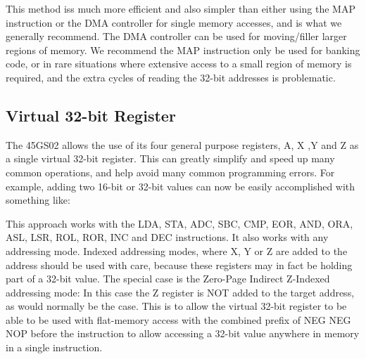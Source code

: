 This method iss much more efficient and also simpler than either using the MAP instruction or the DMA controller for single memory accesses,
and is what we generally recommend.  The DMA controller can be used for moving/filler larger regions of memory.
We recommend the MAP instruction only be used for banking code, or in rare situations where extensive access to a small region of
memory is required, and the extra cycles of reading the 32-bit addresses is problematic.

\subsection{Virtual 32-bit Register}

The 45GS02 allows the use of its four general purpose registers, A, X ,Y and Z as a single virtual 32-bit register. This can greatly
simplify and speed up many common operations, and help avoid many common programming errors.
For example, adding two 16-bit or 32-bit values can now be easily accomplished with something like:


This approach works with the LDA, STA, ADC, SBC, CMP, EOR, AND, ORA, ASL, LSR, ROL, ROR, INC and DEC instructions.
It also works with any addressing mode.  Indexed addressing modes, where X, Y or Z are added to the address should
be used with care, because these registers may in fact be holding part of a 32-bit value.  The special case is the Zero-Page
Indirect Z-Indexed addressing mode: In this case the Z register is NOT added to the target address, as would normally
be the case. This is to allow the virtual 32-bit register to be able to be used with flat-memory access with the combined prefix of 
NEG NEG NOP before the instruction to allow accessing a 32-bit value anywhere in memory in a single instruction.

